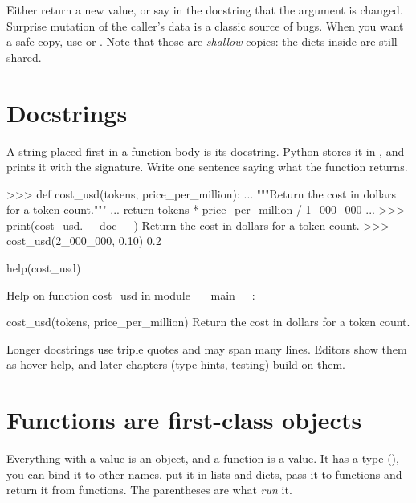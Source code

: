 \begin{gamerule}
Either return a new value, or say in the docstring that the argument is changed.
Surprise mutation of the caller's data is a classic source of bugs. When you want a safe copy,
use  or . Note that those are \emph{shallow} copies:
the dicts inside are still shared.
\end{gamerule}

\section{Docstrings}

A string placed first in a function body is its docstring. Python stores it in
, and  prints it with the signature. Write one sentence saying
what the function returns.

\begin{pycode}
>>> def cost_usd(tokens, price_per_million):
...     """Return the cost in dollars for a token count."""
...     return tokens * price_per_million / 1_000_000
...
>>> print(cost_usd.__doc__)
Return the cost in dollars for a token count.
>>> cost_usd(2_000_000, 0.10)
0.2
\end{pycode}

\begin{pycode}
help(cost_usd)
\end{pycode}
\begin{rawcode}
Help on function cost_usd in module __main__:

cost_usd(tokens, price_per_million)
    Return the cost in dollars for a token count.
\end{rawcode}

Longer docstrings use triple quotes and may span many lines. Editors show them as hover help,
and later chapters (type hints, testing) build on them.

\section{Functions are first-class objects}

Everything with a value is an object, and a function is a value. It has a type
(), you can bind it to other names, put it in lists and dicts, pass it to
functions and return it from functions. The parentheses are what \emph{run} it.

